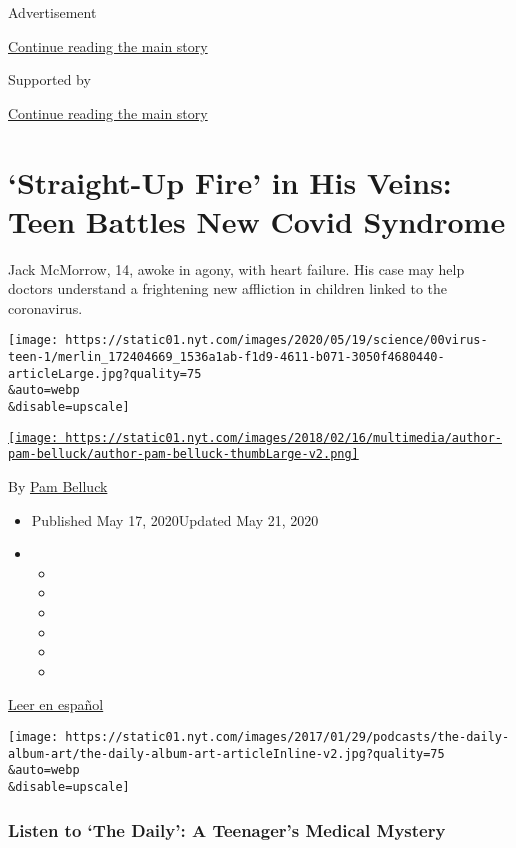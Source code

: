 Advertisement

\protect\hyperlink{after-top}{Continue reading the main story}

Supported by

\protect\hyperlink{after-sponsor}{Continue reading the main story}

\hypertarget{straight-up-fire-in-his-veins-teen-battles-new-covid-syndrome}{%
\section{`Straight-Up Fire' in His Veins: Teen Battles New Covid
Syndrome}\label{straight-up-fire-in-his-veins-teen-battles-new-covid-syndrome}}

Jack McMorrow, 14, awoke in agony, with heart failure. His case may help
doctors understand a frightening new affliction in children linked to
the coronavirus.

\texttt{[image: https://static01.nyt.com/images/2020/05/19/science/00virus-teen-1/merlin\_172404669\_1536a1ab-f1d9-4611-b071-3050f4680440-articleLarge.jpg?quality=75\\\&auto=webp\\\&disable=upscale]}

\href{https://www.nytimes.com/by/pam-belluck}{\texttt{[image: https://static01.nyt.com/images/2018/02/16/multimedia/author-pam-belluck/author-pam-belluck-thumbLarge-v2.png]}}

By \href{https://www.nytimes.com/by/pam-belluck}{Pam Belluck}

\begin{itemize}
\item
  Published May 17, 2020Updated May 21, 2020
\item
  \begin{itemize}
  \item
  \item
  \item
  \item
  \item
  \item
  \end{itemize}
\end{itemize}

\href{https://www.nytimes.com/es/2020/05/18/espanol/sindrome-coronavirus-ninos.html}{Leer
en español}

\texttt{[image: https://static01.nyt.com/images/2017/01/29/podcasts/the-daily-album-art/the-daily-album-art-articleInline-v2.jpg?quality=75\\\&auto=webp\\\&disable=upscale]}

\hypertarget{listen-to-the-daily-a-teenagers-medical-mystery}{%
\subsubsection{Listen to `The Daily': A Teenager's Medical
Mystery}\label{listen-to-the-daily-a-teenagers-medical-mystery}}

